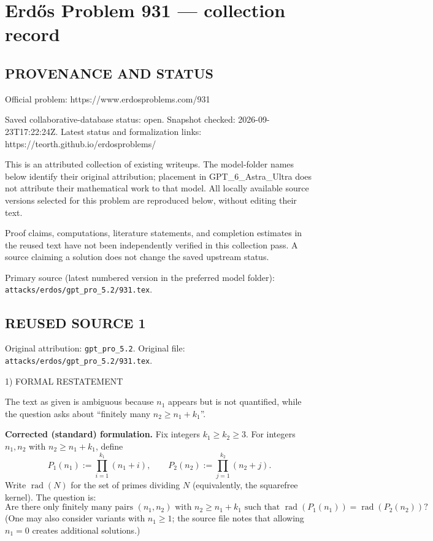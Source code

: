 \section*{Erd\H{o}s Problem 931 --- collection record}

\subsection*{PROVENANCE AND STATUS}
Official problem: https://www.erdosproblems.com/931

Saved collaborative-database status: open.
Snapshot checked: 2026-09-23T17:22:24Z.
Latest status and formalization links: https://teorth.github.io/erdosproblems/

This is an attributed collection of existing writeups. The model-folder names below identify their original attribution; placement in GPT\_6\_Astra\_Ultra does not attribute their mathematical work to that model. All locally available source versions selected for this problem are reproduced below, without editing their text.

Proof claims, computations, literature statements, and completion estimates in the reused text have not been independently verified in this collection pass. A source claiming a solution does not change the saved upstream status.

Primary source (latest numbered version in the preferred model folder): \texttt{attacks/erdos/gpt\_pro\_5.2/931.tex}.

\subsection*{REUSED SOURCE 1}
Original attribution: \texttt{gpt\_pro\_5.2}.
Original file: \texttt{attacks/erdos/gpt\_pro\_5.2/931.tex}.


1) FORMAL RESTATEMENT

The text as given is ambiguous because $n_1$ appears but is not quantified, while the question asks about ``finitely many $n_2\ge n_1+k_1$''.

\medskip
\noindent\textbf{Corrected (standard) formulation.}
Fix integers $k_1\ge k_2\ge 3$.
For integers $n_1,n_2$ with $n_2\ge n_1+k_1$, define
\[
P_1(n_1):=\prod_{i=1}^{k_1}(n_1+i),\qquad P_2(n_2):=\prod_{j=1}^{k_2}(n_2+j).
\]
Write $\operatorname{rad}(N)$ for the set of primes dividing $N$ (equivalently, the squarefree kernel).
The question is:
\[
\text{Are there only finitely many pairs }(n_1,n_2)\text{ with }n_2\ge n_1+k_1\text{ such that }\operatorname{rad}(P_1(n_1))=\operatorname{rad}(P_2(n_2))?
\]
(One may also consider variants with $n_1\ge 1$; the source file notes that allowing $n_1=0$ creates additional solutions.)


